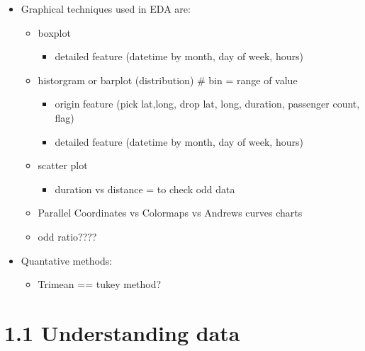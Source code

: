\documentclass[11pt]{article}
\providecommand{\tightlist}{%
      \setlength{\itemsep}{0pt}\setlength{\parskip}{0pt}}
\begin{document}
\begin{itemize}
\tightlist
\item
  Graphical techniques used in EDA are:

  \begin{itemize}
  \tightlist
  \item
    boxplot

    \begin{itemize}
    \tightlist
    \item
      detailed feature (datetime by month, day of week, hours)
    \end{itemize}
  \item
    historgram or barplot (distribution) \# bin = range of value

    \begin{itemize}
    \tightlist
    \item
      origin feature (pick lat,long, drop lat, long, duration, passenger
      count, flag)
    \item
      detailed feature (datetime by month, day of week, hours)
    \end{itemize}
  \item
    scatter plot

    \begin{itemize}
    \tightlist
    \item
      duration vs distance = to check odd data
    \end{itemize}
  \item
    Parallel Coordinates vs Colormaps vs Andrews curves charts
  \item
    odd ratio????
  \end{itemize}
\item
  Quantative methods:

  \begin{itemize}
  \tightlist
  \item
    Trimean == tukey method?
  \end{itemize}
\end{itemize}

    \section{1.1 Understanding data}\label{understanding-data}
\end{document}
